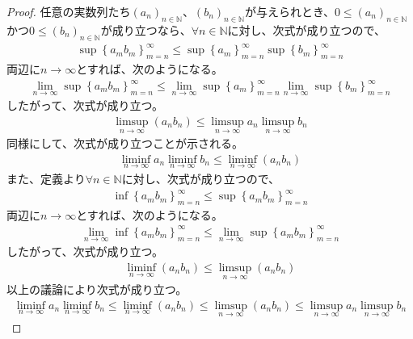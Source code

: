 \documentclass[dvipdfmx]{jsarticle}
\begin{document}
\begin{proof}
任意の実数列たち$\left( a_{n} \right)_{n \in \mathbb{N}}$、$\left( b_{n} \right)_{n \in \mathbb{N}}$が与えられとき、$0 \leq \left( a_{n} \right)_{n \in \mathbb{N}}$かつ$0 \leq \left( b_{n} \right)_{n \in \mathbb{N}}$が成り立つなら、$\forall n \in \mathbb{N}$に対し、次式が成り立つので、
\begin{align*}
\sup\left\{ a_{m}b_{m} \right\}_{m = n}^{\infty} \leq \sup\left\{ a_{m} \right\}_{m = n}^{\infty}\sup\left\{ b_{m} \right\}_{m = n}^{\infty}
\end{align*}
両辺に$n \rightarrow \infty$とすれば、次のようになる。
\begin{align*}
\lim_{n \rightarrow \infty}{\sup\left\{ a_{m}b_{m} \right\}_{m = n}^{\infty}} \leq \lim_{n \rightarrow \infty}{\sup\left\{ a_{m} \right\}_{m = n}^{\infty}}\lim_{n \rightarrow \infty}{\sup\left\{ b_{m} \right\}_{m = n}^{\infty}}
\end{align*}
したがって、次式が成り立つ。
\begin{align*}
\limsup_{n \rightarrow \infty}\left( a_{n}b_{n} \right) \leq \limsup_{n \rightarrow \infty}a_{n}\limsup_{n \rightarrow \infty}b_{n}
\end{align*}
同様にして、次式が成り立つことが示される。
\begin{align*}
\liminf_{n \rightarrow \infty}a_{n}\liminf_{n \rightarrow \infty}b_{n} \leq \liminf_{n \rightarrow \infty}\left( a_{n}b_{n} \right)
\end{align*}
また、定義より$\forall n \in \mathbb{N}$に対し、次式が成り立つので、
\begin{align*}
\inf\left\{ a_{m}b_{m} \right\}_{m = n}^{\infty} \leq \sup\left\{ a_{m}b_{m} \right\}_{m = n}^{\infty}
\end{align*}
両辺に$n \rightarrow \infty$とすれば、次のようになる。
\begin{align*}
\lim_{n \rightarrow \infty}{\inf\left\{ a_{m}b_{m} \right\}_{m = n}^{\infty}} \leq \lim_{n \rightarrow \infty}{\sup\left\{ a_{m}b_{m} \right\}_{m = n}^{\infty}}
\end{align*}
したがって、次式が成り立つ。
\begin{align*}
\liminf_{n \rightarrow \infty}\left( a_{n}b_{n} \right) \leq \limsup_{n \rightarrow \infty}\left( a_{n}b_{n} \right)
\end{align*}
以上の議論により次式が成り立つ。
\begin{align*}
\liminf_{n \rightarrow \infty}a_{n}\liminf_{n \rightarrow \infty}b_{n} \leq \liminf_{n \rightarrow \infty}\left( a_{n}b_{n} \right) \leq \limsup_{n \rightarrow \infty}\left( a_{n}b_{n} \right) \leq \limsup_{n \rightarrow \infty}a_{n}\limsup_{n \rightarrow \infty}b_{n}

\end{align*}
\end{proof}
\end{document}
